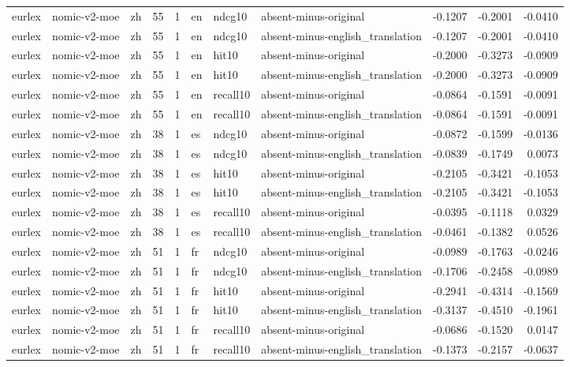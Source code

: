 \begin{tabular}{lllrrlllrrr}
eurlex & nomic-v2-moe & zh & 55 & 1 & en & ndcg10 & absent-minus-original & -0.1207 & -0.2001 & -0.0410 \\
eurlex & nomic-v2-moe & zh & 55 & 1 & en & ndcg10 & absent-minus-english\_translation & -0.1207 & -0.2001 & -0.0410 \\
eurlex & nomic-v2-moe & zh & 55 & 1 & en & hit10 & absent-minus-original & -0.2000 & -0.3273 & -0.0909 \\
eurlex & nomic-v2-moe & zh & 55 & 1 & en & hit10 & absent-minus-english\_translation & -0.2000 & -0.3273 & -0.0909 \\
eurlex & nomic-v2-moe & zh & 55 & 1 & en & recall10 & absent-minus-original & -0.0864 & -0.1591 & -0.0091 \\
eurlex & nomic-v2-moe & zh & 55 & 1 & en & recall10 & absent-minus-english\_translation & -0.0864 & -0.1591 & -0.0091 \\
eurlex & nomic-v2-moe & zh & 38 & 1 & es & ndcg10 & absent-minus-original & -0.0872 & -0.1599 & -0.0136 \\
eurlex & nomic-v2-moe & zh & 38 & 1 & es & ndcg10 & absent-minus-english\_translation & -0.0839 & -0.1749 & 0.0073 \\
eurlex & nomic-v2-moe & zh & 38 & 1 & es & hit10 & absent-minus-original & -0.2105 & -0.3421 & -0.1053 \\
eurlex & nomic-v2-moe & zh & 38 & 1 & es & hit10 & absent-minus-english\_translation & -0.2105 & -0.3421 & -0.1053 \\
eurlex & nomic-v2-moe & zh & 38 & 1 & es & recall10 & absent-minus-original & -0.0395 & -0.1118 & 0.0329 \\
eurlex & nomic-v2-moe & zh & 38 & 1 & es & recall10 & absent-minus-english\_translation & -0.0461 & -0.1382 & 0.0526 \\
eurlex & nomic-v2-moe & zh & 51 & 1 & fr & ndcg10 & absent-minus-original & -0.0989 & -0.1763 & -0.0246 \\
eurlex & nomic-v2-moe & zh & 51 & 1 & fr & ndcg10 & absent-minus-english\_translation & -0.1706 & -0.2458 & -0.0989 \\
eurlex & nomic-v2-moe & zh & 51 & 1 & fr & hit10 & absent-minus-original & -0.2941 & -0.4314 & -0.1569 \\
eurlex & nomic-v2-moe & zh & 51 & 1 & fr & hit10 & absent-minus-english\_translation & -0.3137 & -0.4510 & -0.1961 \\
eurlex & nomic-v2-moe & zh & 51 & 1 & fr & recall10 & absent-minus-original & -0.0686 & -0.1520 & 0.0147 \\
eurlex & nomic-v2-moe & zh & 51 & 1 & fr & recall10 & absent-minus-english\_translation & -0.1373 & -0.2157 & -0.0637 \\

\end{tabular}
